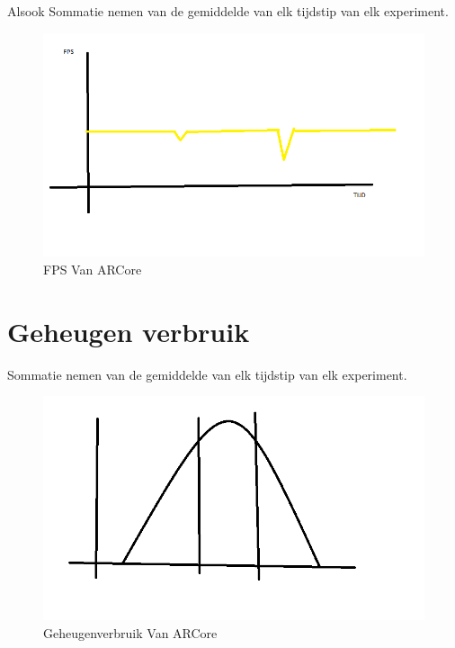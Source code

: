 Alsook
Sommatie nemen van de gemiddelde van elk tijdstip van elk experiment.
\begin{figure}
    \includegraphics[width=\textwidth]{img/fpsgrafiek}\caption{FPS Van ARCore}\label{fig:fpsgr1}
\end{figure}
\section{Geheugen verbruik}
Sommatie nemen van de gemiddelde van elk tijdstip van elk experiment.
\begin{figure}
    \includegraphics[width=\textwidth]{img/normaleverdeling}\caption{Geheugenverbruik Van ARCore}\label{fig:mem1}
\end{figure}
